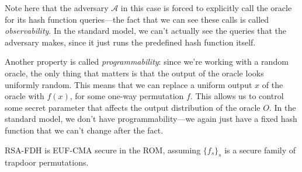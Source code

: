 Note here that the adversary $\mathcal{A}$ in this case is forced to explicitly call the oracle for its hash function queries---the fact that we can see these calls is called \emph{observability}. In the standard model, we can't actually see the queries that the adversary makes, since it just runs the predefined hash function itself.

Another property is called \emph{programmability}: since we're working with a random oracle, the only thing that matters is that the output of the oracle looks uniformly random. This means that we can replace a uniform output $x$ of the oracle with $f(x)$, for some one-way permutation $f$. This allows us to control some secret parameter that affects the output distribution of the oracle $O$. In the standard model, we don't have programmability---we again just have a fixed hash function that we can't change after the fact.

\begin{theorem}
    RSA-FDH is EUF-CMA secure in the ROM, assuming $\{f_s\}_s$ is a secure family of trapdoor permutations.
\end{theorem}

